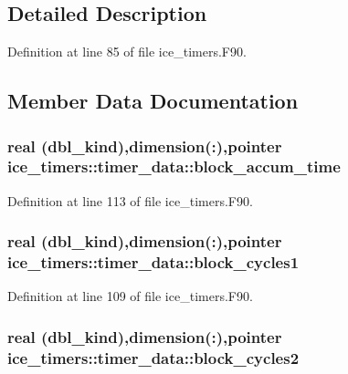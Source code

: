\subsection{Detailed Description}


Definition at line 85 of file ice\_\-timers.F90.

\subsection{Member Data Documentation}
\hypertarget{typeice__timers_1_1timer__data_aad4925b00e158499fb0b21cc5d08ee9f}{
\subsubsection[{block\_\-accum\_\-time}]{\setlength{\rightskip}{0pt plus 5cm}real (dbl\_\-kind),dimension(:),pointer {\bf ice\_\-timers::timer\_\-data::block\_\-accum\_\-time}}}
\label{typeice__timers_1_1timer__data_aad4925b00e158499fb0b21cc5d08ee9f}


Definition at line 113 of file ice\_\-timers.F90.\hypertarget{typeice__timers_1_1timer__data_af720fe0bbaf3a4f78688f8bd3512dfdf}{
\subsubsection[{block\_\-cycles1}]{\setlength{\rightskip}{0pt plus 5cm}real (dbl\_\-kind),dimension(:),pointer {\bf ice\_\-timers::timer\_\-data::block\_\-cycles1}}}
\label{typeice__timers_1_1timer__data_af720fe0bbaf3a4f78688f8bd3512dfdf}


Definition at line 109 of file ice\_\-timers.F90.\hypertarget{typeice__timers_1_1timer__data_a3e77c3fec2569f4bc3d012fe6f3c4dd4}{
\subsubsection[{block\_\-cycles2}]{\setlength{\rightskip}{0pt plus 5cm}real (dbl\_\-kind),dimension(:),pointer {\bf ice\_\-timers::timer\_\-data::block\_\-cycles2}}}
\label{typeice__timers_1_1timer__data_a3e77c3fec2569f4bc3d012fe6f3c4dd4}


